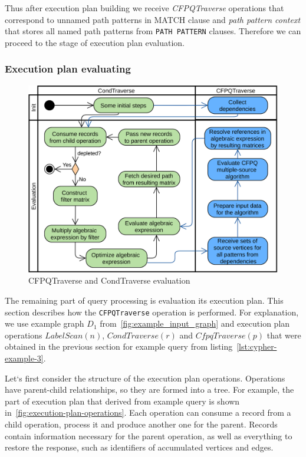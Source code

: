 Thus after execution plan building we receive \textit{CFPQTraverse} operations that correspond to unnamed path patterns in MATCH clause and \textit{path pattern context} that stores all named path patterns from \lstinline{PATH PATTERN} clauses. Therefore we can proceed to the stage of execution plan evaluation.


\subsubsection{Execution plan evaluating}
\label{subsubsec:execution-plan-evaluating}

\begin{figure}[h!]
  \centering
  \includegraphics[width=\linewidth]{pictures/execution-plan-evaluation.png}
  \caption{CFPQTraverse and CondTraverse evaluation}
  \label{fig:execution-plan-evaluation}
\end{figure}

The remaining part of query processing is evaluation its execution plan. This section describes how the \lstinline{CFPQTraverse} operation is performed. For explanation, we use example graph $D_1$ from~\autoref{fig:example_input_graph} and execution plan operations $LabelScan(n)$, $CondTraverse(r)$ and $CfpqTraverse(p)$ that were obtained in the previous section for example query from listing~\autoref{lst:cypher-example-3}.

Let`s first consider the structure of the execution plan operations. Operations have parent-child relationships, so they are formed into a tree. For example, the part of execution plan that derived from example query is shown in~\autoref{fig:execution-plan-operations}. Each operation can consume a record from a child operation, process it and produce another one for the parent. Records contain information necessary for the parent operation, as well as everything to restore the response, such as identifiers of accumulated vertices and edges.

